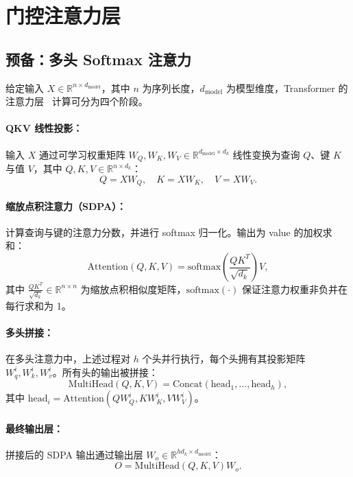 \documentclass{article} %
\begin{document}
\section{门控注意力层}

\subsection{预备：多头 Softmax 注意力}

给定输入 $ X \in \mathbb{R}^{n \times d_{\text{model}}} $，其中 $ n $ 为序列长度，$ d_{\text{model}} $ 为模型维度，Transformer 的注意力层~\citep{vaswani2017attention} 计算可分为四个阶段。

\paragraph{QKV 线性投影：} 输入 $ X $ 通过可学习权重矩阵 $ W_Q, W_K, W_V \in \mathbb{R}^{d_{\text{model}} \times d_k}$ 线性变换为查询 $ Q $、键 $ K $ 与值 $ V $，其中 $ Q, K, V \in \mathbb{R}^{n \times d_k}$：
\begin{equation}
Q = XW_Q, \quad K = XW_K, \quad V = XW_V.
\label{eq:qkv_map}
\end{equation}

\paragraph{缩放点积注意力（SDPA）：} 计算查询与键的注意力分数，并进行 softmax 归一化。输出为 value 的加权求和：
\begin{equation}
   \text{Attention}(Q, K, V) = \text{softmax}\left(\frac{QK^T}{\sqrt{d_k}}\right)V,
\end{equation}
其中 $ \frac{QK^T}{\sqrt{d_k}} \in \mathbb{R}^{n \times n} $ 为缩放点积相似度矩阵，$ \text{softmax}(\cdot) $ 保证注意力权重非负并在每行求和为 1。

\paragraph{多头拼接：} 在多头注意力中，上述过程对 $ h $ 个头并行执行，每个头拥有其投影矩阵 $ W_q^i, W_k^i, W_v^i $。所有头的输出被拼接：
\begin{equation}
   \text{MultiHead}(Q, K, V) = \text{Concat}(\text{head}_1, \dots, \text{head}_h),
\label{eq:SDPA}
\end{equation}
其中 $ \text{head}_i = \text{Attention}(QW_Q^i, KW_K^i, VW_V^i) $。

\paragraph{最终输出层：} 拼接后的 SDPA 输出通过输出层 $ W_o \in \mathbb{R}^{h d_k \times d_{\text{model}}}$：
\begin{equation}
   O = \text{MultiHead}(Q, K, V)W_o.
\label{eq:output}
\end{equation}
\end{document}
